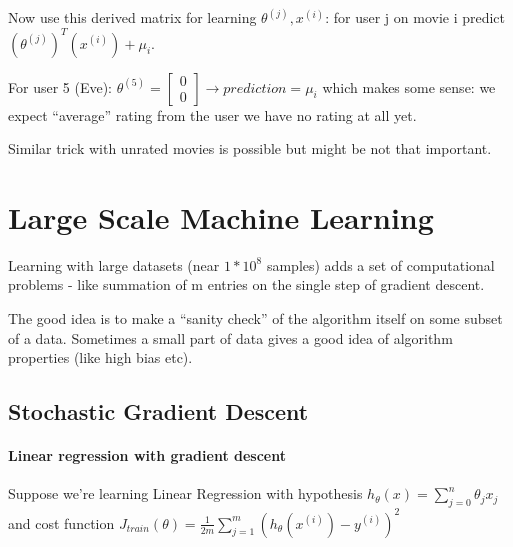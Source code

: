 \documentclass{scrartcl}
\begin{document}
Now use this derived matrix for learning $\theta^{(j)}, x^{(i)}$: for
user j on movie i predict $(\theta^{(j)})^T (x^{(i)}) + \mu_i$.

For user 5 (Eve): $\theta^{(5)} = \left[ \begin{array}{c}  0 \\
    0 \end{array} \right] \to prediction = \mu_i $ which makes some
sense: we expect ``average'' rating from the user we have no rating at
all yet.

Similar trick with unrated movies is possible but might be not that
important.  

\section{Large Scale Machine Learning}
\label{sec:17}

Learning with large datasets (near $1 * 10^8$ samples) adds a set of
computational problems - like summation of m entries on the single
step of gradient descent.

The good idea is to make a ``sanity check'' of the algorithm itself on
some subset of a data. Sometimes a small part of data gives a good
idea of algorithm properties (like high bias etc).

\subsection{Stochastic Gradient Descent}
\label{sec:17-2}

\paragraph{Linear regression with gradient descent}

Suppose we're learning Linear Regression with hypothesis $h_\theta(x)
= \sum \limits_{j=0}^n \theta_{j} x_{j}$ and cost function
$J_{train}(\theta) = \frac{1}{2m}\sum
\limits_{j=1}^m(h_\theta(x^{(i)}) - y^{(i)})^2$ 
\end{document}
